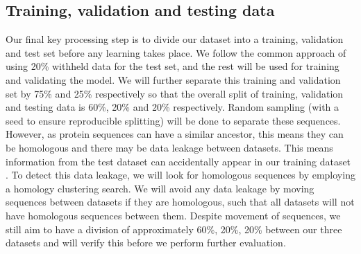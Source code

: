 \documentclass{l4proj}
\begin{document}
\subsection{Training, validation and testing data}
\label{chap:design section:datasets}

Our final key processing step is to divide our dataset into a training, validation and test set before any learning takes place. We follow the common approach of using 20\% withheld data for the test set, and the rest will be used for training and validating the model. We will further separate this training and validation set by 75\% and 25\% respectively so that the overall split of training, validation and testing data is 60\%, 20\% and 20\% respectively. Random sampling (with a seed to ensure reproducible splitting) will be done to separate these sequences. However, as protein sequences can have a similar ancestor, this means they can be homologous and there may be data leakage between datasets. This means information from the test dataset can accidentally appear in our training dataset \citep{Cook:22}. To detect this data leakage, we will look for homologous sequences by employing a homology clustering search. We will avoid any data leakage by moving sequences between datasets if they are homologous, such that all datasets will not have homologous sequences between them. Despite movement of sequences, we still aim to have a division of approximately 60\%, 20\%, 20\% between our three datasets and will verify this before we perform further evaluation. 
\end{document}
